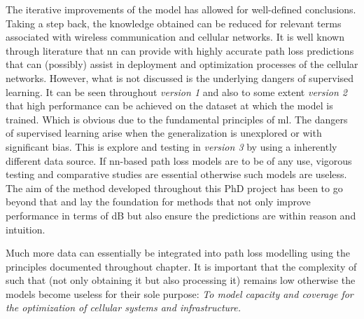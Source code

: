 The iterative improvements of the model has allowed for well-defined conclusions. Taking a step back, the knowledge obtained can be reduced for relevant terms associated with wireless communication and cellular networks. It is well known through literature that \gls{nn} can provide with highly accurate path loss predictions that can (possibly) assist in deployment and optimization processes of the cellular networks. However, what is not discussed is the underlying dangers of supervised learning. It can be seen throughout \emph{version 1} and also to some extent \emph{version 2} that high performance can be achieved on the dataset at which the model is trained. Which is obvious due to the fundamental principles of \gls{ml}. The dangers of supervised learning arise when the generalization is unexplored or with significant bias. This is explore and testing in \emph{version 3} by using a inherently different data source. If \gls{nn}-based path loss models are to be of any use, vigorous testing and comparative studies are essential otherwise such models are useless. The aim of the method developed throughout this PhD project has been to go beyond that and lay the foundation for methods that not only improve performance in terms of dB but also ensure the predictions are within reason and intuition. 

Much more data can essentially be integrated into path loss modelling using the principles documented throughout chapter. It is important that the complexity of such that (not only obtaining it but also processing it) remains low otherwise the models become useless for their sole purpose: \emph{To model capacity and coverage for the optimization of cellular systems and infrastructure.}